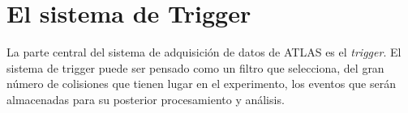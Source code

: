 

\section{El sistema de Trigger}

La parte central del sistema de adquisición de datos de ATLAS es el
\emph{trigger}. El sistema de trigger puede ser pensado como un filtro que
selecciona, del gran número de colisiones que tienen lugar en el experimento,
los eventos que serán almacenadas para su posterior procesamiento y análisis.

